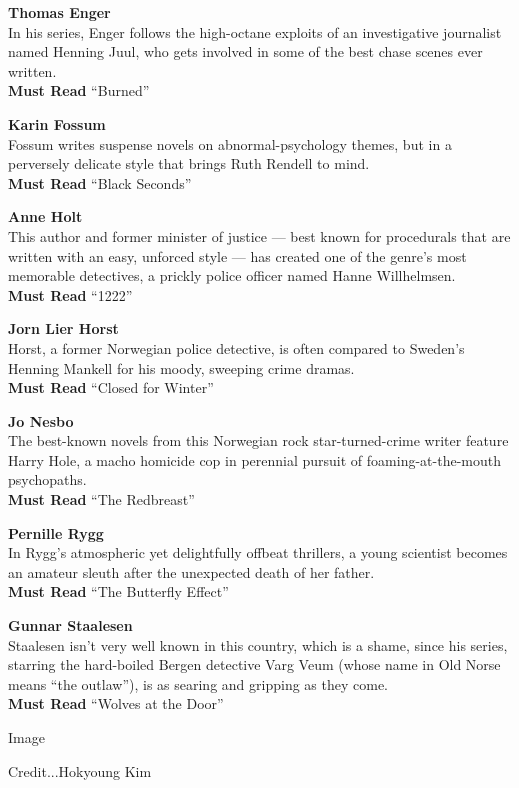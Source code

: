 \textbf{Thomas Enger}\\
In his series, Enger follows the high-octane exploits of an
investigative journalist named Henning Juul, who gets involved in some
of the best chase scenes ever written.\\
\textbf{Must Read} ``Burned''

\textbf{Karin Fossum}\\
Fossum writes suspense novels on abnormal-psychology themes, but in a
perversely delicate style that brings Ruth Rendell to mind.\\
\textbf{Must Read} ``Black Seconds''

\textbf{Anne Holt}\\
This author and former minister of justice --- best known for
procedurals that are written with an easy, unforced style --- has
created one of the genre's most memorable detectives, a prickly police
officer named Hanne Willhelmsen.\\
\textbf{Must Read} ``1222''

\textbf{Jorn Lier Horst}\\
Horst, a former Norwegian police detective, is often compared to
Sweden's Henning Mankell for his moody, sweeping crime dramas.\\
\textbf{Must Read} ``Closed for Winter''

\textbf{Jo Nesbo}\\
The best-known novels from this Norwegian rock star-turned-crime writer
feature Harry Hole, a macho homicide cop in perennial pursuit of
foaming-at-the-mouth psychopaths.\\
\textbf{Must Read} ``The Redbreast''

\textbf{Pernille Rygg}\\
In Rygg's atmospheric yet delightfully offbeat thrillers, a young
scientist becomes an amateur sleuth after the unexpected death of her
father.\\
\textbf{Must Read} ``The Butterfly Effect''

\textbf{Gunnar Staalesen}\\
Staalesen isn't very well known in this country, which is a shame, since
his series, starring the hard-boiled Bergen detective Varg Veum (whose
name in Old Norse means ``the outlaw''), is as searing and gripping as
they come.\\
\textbf{Must Read} ``Wolves at the Door''

Image

Credit...Hokyoung Kim

